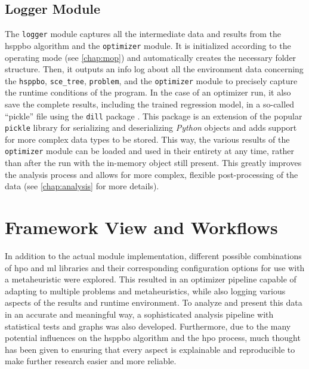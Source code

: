 \subsection{Logger Module}

The \texttt{logger} module captures all the intermediate data and results from the \gls{hsppbo} algorithm and the \texttt{optimizer} module. It is initialized according to the operating mode (see \cref{chap:mop}) and automatically creates the necessary folder structure. Then, it outputs an info log about all the environment data concerning the \texttt{hsppbo}, \texttt{sce\_tree}, \texttt{problem}, and the \texttt{optimizer} module to precisely capture the runtime conditions of the program. In the case of an optimizer run, it also save the complete results, including the trained regression model, in a so-called \enquote{pickle} file using the \texttt{dill} package \cite{mckerns2012building}. This package is an extension of the popular \texttt{pickle} library for serializing and deserializing \textit{Python} objects and adds support for more complex data types to be stored. This way, the various results of the \texttt{optimizer} module can be loaded and used in their entirety at any time, rather than after the run with the in-memory object still present.
This greatly improves the analysis process and allows for more complex, flexible post-processing of the data (see \cref{chap:analysis} for more details).

\section{Framework View and Workflows}
\label{chap:workflow}

In addition to the actual module implementation, different possible combinations of \gls{hpo} and \gls{ml} libraries and their corresponding configuration options for use with a metaheuristic were explored. This resulted in an optimizer pipeline capable of adapting to multiple problems and metaheuristics, while also logging various aspects of the results and runtime environment. To analyze and present this data in an accurate and meaningful way, a sophisticated analysis pipeline with statistical tests and graphs was also developed.
Furthermore, due to the many potential influences on the \gls{hsppbo} algorithm and the \gls{hpo} process, much thought has been given to ensuring that every aspect is explainable and reproducible to make further research easier and more reliable.

